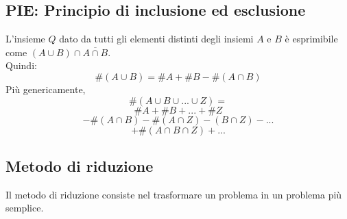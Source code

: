 \documentclass{report}
\begin{document}
    \subsection{PIE: Principio di inclusione ed esclusione}
        L'insieme $Q$ dato da tutti gli elementi distinti degli insiemi $A$ e $B$
        è esprimibile come $(A \cup B) \cap \overline{A \cap B}$. \\
        Quindi:
        $$\#\left(A \cup B\right) = \#A + \#B - \#\left(A \cap B\right)$$
        Più genericamente,
        $$\#\left(A \cup B \cup ... \cup Z\right) = $$
        $$\#A + \#B + ... + \#Z$$
        $$ - \#\left(A \cap B\right) - \#\left(A \cap Z\right) - \left(B \cap Z\right) - ... $$
        $$ + \#\left(A \cap B \cap Z\right) + ... $$
    \subsection{Metodo di riduzione}
        Il metodo di riduzione consiste nel trasformare un problema in un problema
        più semplice.
\end{document}
